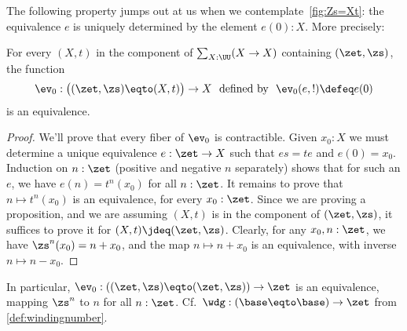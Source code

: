 The following property jumps out at us when we contemplate~\cref{fig:Zs=Xt}:
the equivalence $e$ is uniquely determined by the element $e(0):X$.
More precisely:
\begin{lemma}
  \label{lem:IdCisZet}
For every $(X,t)$ in the component of $\sum_{X:\UU}(X\to X)$
containing $(\zet,\zs)$, the function
  \[
    \ev_0:\bigl((\zet,\zs)\eqto(X,t)\bigr)\to X
    \text{~~defined by~~} \ev_0(e,!) \defeq e(0)
  \]
  is an equivalence.
\end{lemma}
\begin{proof}
  We'll prove that every fiber of $\ev_0$ is contractible.
  Given $x_0:X$ we must determine a unique equivalence $e:\zet\to X$
  such that $es=te$ and $e(0)=x_0$.
  Induction on $n:\zet$ (positive and negative $n$ separately)
  shows that for such an $e$, we have $e(n) = t^n(x_0)$ for all $n:\zet$.
  It remains to prove that $n\mapsto t^n(x_0)$ is an equivalence,
  for every $x_0:\zet$. Since we are proving a proposition,
  and we are assuming $(X,t)$ is in the component of $(\zet,\zs)$,
  it suffices to prove it for $(X,t) \jdeq (\zet,\zs)$.
  Clearly, for any $x_0,n:\zet$, we have $\zs^n(x_0) = n + x_0$,
  and the map $n \mapsto n + x_0$ is an equivalence,
  with inverse $n \mapsto n - x_0$.
\end{proof}
In particular, $\ev_0: ((\zet,\zs)\eqto(\zet,\zs))\to \zet$ is an equivalence,
mapping $\zs^n$ to $n$ for all $n:\zet$.
Cf.\ $\wdg : (\base\eqto\base)\to\zet$ from \cref{def:windingnumber}.

